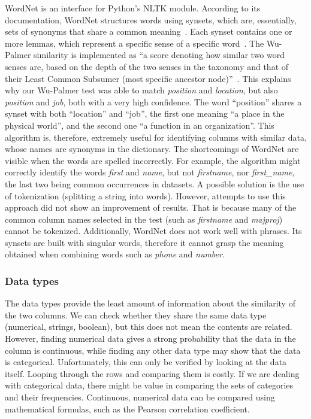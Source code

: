 WordNet is an interface for Python's NLTK module.
According to its documentation, WordNet structures words using synsets, which are, essentially, sets of synonyms that
share a common meaning~\cite{wordnet}.
Each synset contains one or more lemmas, which represent a specific sense of a specific word~\cite{wordnet}.
The Wu-Palmer similarity is implemented as ``a score denoting how similar two word senses are, based on the depth of the
two senses in the taxonomy and that of their Least Common Subsumer (most specific ancestor node)''~\cite{wordnet}.
This explains why our Wu-Palmer test was able to match \textit{position} and \textit{location}, but also \textit{position}
and \textit{job}, both with a very high confidence.
The word ``position'' shares a synset with both ``location'' and ``job'', the first one meaning ``a place in the physical world'',
and the second one ``a function in an organization''.
This algorithm is, therefore, extremely useful for identifying columns with similar data, whose names are synonyms in the
dictionary.
The shortcomings of WordNet are visible when the words are spelled incorrectly.
For example, the algorithm might correctly identify the words \textit{first} and \textit{name}, but not \textit{firstname},
nor \textit{first\_name}, the last two being common occurrences in datasets.
A possible solution is the use of tokenization (splitting a string into words).
However, attempts to use this approach did not show an improvement of results.
That is because many of the common column names selected in the test (such as \textit{firstname} and \textit{majproj}) cannot
be tokenized.
Additionally, WordNet does not work well with phrases.
Its synsets are built with singular words, therefore it cannot grasp the meaning obtained when combining words such as
\textit{phone} and \textit{number}.

\subsubsection{Data types}
The data types provide the least amount of information about the similarity of the two columns.
We can check whether they share the same data type (numerical, strings, boolean), but this does not mean the contents
are related.
However, finding numerical data gives a strong probability that the data in the column is continuous, while finding any other
data type may show that the data is categorical.
Unfortunately, this can only be verified by looking at the data itself.
Looping through the rows and comparing them is costly.
If we are dealing with categorical data, there might be value in comparing the sets of categories and their frequencies.
Continuous, numerical data can be compared using mathematical formulas, such as the Pearson correlation coefficient.

